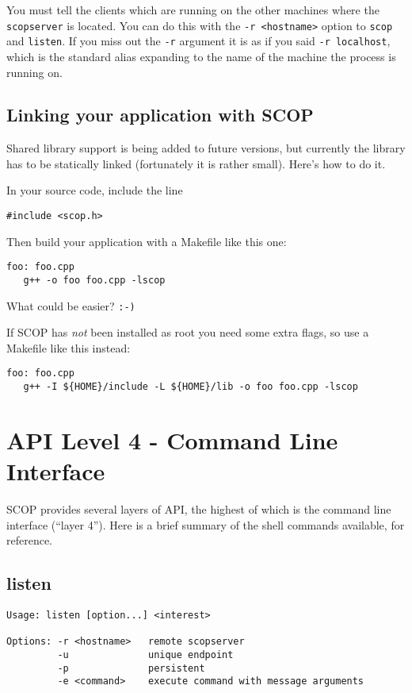 \documentclass[12pt,a4paper,twoside]{article}
\renewcommand{\_}{\texttt{\symbol{95}}}
\begin{document}
You must tell the clients which are running on the other machines
where the \texttt{scopserver} is located. You can do this with
the \texttt{-r <hostname>} option to \texttt{scop} and \texttt{listen}.
If you miss out the \texttt{-r} argument it is as if you said
\texttt{-r localhost}, which is the standard alias expanding
to the name of the machine the process is running on.

\subsection{Linking your application with SCOP}

Shared library support is being added to future versions, but
currently the library has to be statically linked (fortunately it is
rather small). Here's how to do it.

In your source code, include the line

\begin{verbatim}
#include <scop.h>
\end{verbatim}

Then build your application with a Makefile like this one:
\begin{verbatim}
foo: foo.cpp
   g++ -o foo foo.cpp -lscop
\end{verbatim}

What could be easier? \texttt{:-)}

If SCOP has \textit{not} been installed as root you need some extra flags,
so use a Makefile like this instead:
\begin{verbatim}
foo: foo.cpp
   g++ -I ${HOME}/include -L ${HOME}/lib -o foo foo.cpp -lscop
\end{verbatim}

\section{API Level 4 - Command Line Interface}

SCOP provides several layers of API, the highest of which is the
command line interface (``layer 4''). Here is a brief summary of
the shell commands available, for reference.

\subsection{listen}

\begin{verbatim}
Usage: listen [option...] <interest>

Options: -r <hostname>   remote scopserver
         -u              unique endpoint
         -p              persistent
         -e <command>    execute command with message arguments
\end{verbatim}
\end{document}

